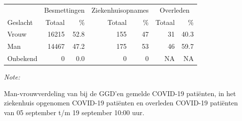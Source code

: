 \documentclass[
  english,
  man,floatsintext]{apa6}
\begin{document}
\begin{table}
\centering\begingroup\fontsize{11}{13}\selectfont

\begin{threeparttable}
\begin{tabular}{lrrrrrr}
\toprule
\multicolumn{1}{c}{ } & \multicolumn{2}{c}{Besmettingen} & \multicolumn{2}{c}{Ziekenhuisopnames} & \multicolumn{2}{c}{Overleden} \\
\cmidrule(l{3pt}r{3pt}){2-3} \cmidrule(l{3pt}r{3pt}){4-5} \cmidrule(l{3pt}r{3pt}){6-7}
Geslacht & Totaal & \% & Totaal & \% & Totaal & \%\\
\midrule
Vrouw & 16215 & 52.8 & 155 & 47 & 31 & 40.3\\
Man & 14467 & 47.2 & 175 & 53 & 46 & 59.7\\
Onbekend & 0 & 0.0 & 0 & 0 & NA & NA\\
\bottomrule
\end{tabular}
\begin{tablenotes}
\item \textit{Note: } 
\item Man-vrouwverdeling van bij de GGD’en gemelde COVID-19 patiënten, in het ziekenhuis opgenomen COVID-19 patiënten en overleden COVID-19 patiënten van 05 september t/m 19 september 10:00 uur.
\end{tablenotes}
\end{threeparttable}
\endgroup{}
\end{table}
\newpage
\end{document}

